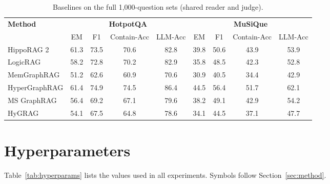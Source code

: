 \documentclass[sigconf, review, anonymous]{acmart}
\begin{document}
\begin{table}[t]
\centering
\caption{Baselines on the full 1{,}000-question sets (shared reader and judge).}
\label{tab:full}
\small
{%
\begin{tabular}{lcccccccc}
\toprule
\multirow{2}{*}{\textbf{Method}} & \multicolumn{4}{c}{\textbf{HotpotQA}} & \multicolumn{4}{c}{\textbf{MuSiQue}} \\
\cmidrule(lr){2-5}\cmidrule(lr){6-9}
 & EM & F1 & Contain-Acc & LLM-Acc & EM & F1 & Contain-Acc & LLM-Acc \\
\midrule
HippoRAG 2      & 61.3 & 73.5 & 70.6 & 82.8 & 39.8 & 50.6 & 43.9 & 53.9 \\
LogicRAG        & 58.2 & 72.8 & 70.2 & 82.9 & 35.8 & 48.5 & 42.3 & 52.8 \\
MemGraphRAG     & 51.2 & 62.6 & 60.9 & 70.6 & 30.9 & 40.5 & 34.4 & 42.9 \\
HyperGraphRAG   & 61.4 & 74.9 & 74.5 & 86.4 & 44.5 & 56.4 & 51.7 & 62.1 \\
MS GraphRAG     & 56.4 & 69.2 & 67.1 & 79.6 & 38.2 & 49.1 & 42.9 & 54.2 \\
HyGRAG          & 54.1 & 67.5 & 64.8 & 78.6 & 34.1 & 44.5 & 37.1 & 47.7 \\
\bottomrule
\end{tabular}}
\end{table}


\section{Hyperparameters}
\label{app:hyper}

Table~\ref{tab:hyperparams} lists the values used in all experiments. Symbols follow Section~\ref{sec:method}.
\end{document}
